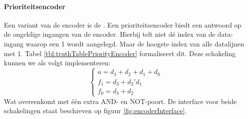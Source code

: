 \paragraph{Prioriteitsencoder}
Een variant van de encoder is de . Een prioriteitsencoder biedt een antwoord op de ongeldige ingangen van de encoder. Hierbij telt niet d\'e index van de data-ingang waarop een 1 wordt aangelegd. Maar de hoogste index van alle datalijnen met 1. Tabel \ref{tbl:truthTablePriorityEncoder} formaliseert dit. Deze schakeling kunnen we als volgt implementeren:
\begin{equation}
\left\{
\begin{array}{l}
a=d_3+d_2+d_1+d_0\\
f_1=d_3+d_2'd_1\\
f_0=d_3+d_2
\end{array}
\right.
\end{equation}
Wat overeenkomt met \'e\'en extra AND- en NOT-poort. De interface voor beide schakelingen staat beschreven op figuur \ref{fig:encoderInterface}.
